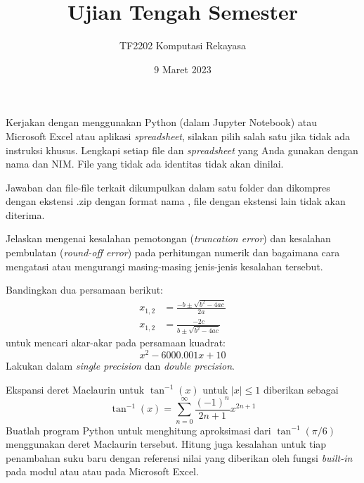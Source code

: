 



\title{Ujian Tengah Semester}
\author{TF2202 Komputasi Rekayasa}
\date{9 Maret 2023}
\maketitle

Kerjakan dengan menggunakan Python (dalam Jupyter Notebook)
atau Microsoft Excel atau aplikasi \textit{spreadsheet},
silakan pilih salah satu
jika tidak ada instruksi khusus.
Lengkapi setiap file  dan \textit{spreadsheet}
yang Anda gunakan dengan nama dan NIM.
File yang tidak ada identitas tidak akan dinilai.


Jawaban dan file-file terkait dikumpulkan dalam satu folder dan
dikompres dengan ekstensi .zip dengan
format nama  , file dengan ekstensi lain tidak
akan diterima.


\begin{soal}
Jelaskan mengenai kesalahan pemotongan (\textit{truncation error})
dan kesalahan pembulatan (\textit{round-off error}) pada perhitungan numerik
dan bagaimana cara mengatasi atau mengurangi masing-masing jenis-jenis
kesalahan tersebut.
\end{soal}


\begin{soal}
Bandingkan dua persamaan berikut:
\begin{align*}
x_{1,2} & = \frac{-b \pm \sqrt{b^2 - 4ac}}{2a} \\
x_{1,2} & = \frac{-2c}{b \pm \sqrt{b^2 - 4ac}}
\end{align*}
untuk mencari akar-akar pada persamaan kuadrat:
\begin{equation*}
x^2 - 6000.001x + 10
\end{equation*}
Lakukan dalam \textit{single precision} dan \textit{double precision}.
\end{soal}


\begin{soal}
Ekspansi deret Maclaurin untuk $\tan^{-1}(x)$ untuk $|x| \leq 1$ diberikan sebagai
\begin{equation*}
\tan^{-1}(x) = \sum_{n=0}^{\infty} \frac{(-1)^{n}}{2n + 1} x^{2n + 1}
\end{equation*}
Buatlah program Python untuk menghitung aproksimasi dari $\tan^{-1}(\pi/6)$ menggunakan deret
Maclaurin tersebut. Hitung juga kesalahan untuk tiap penambahan suku baru dengan referensi
nilai yang diberikan oleh fungsi \textit{built-in} pada modul  atau
 atau pada Microsoft Excel.
\end{soal}

